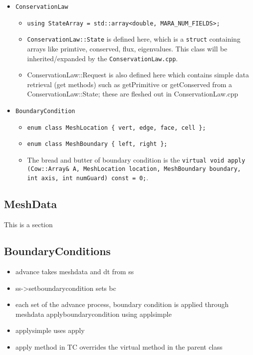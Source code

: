 \documentclass{article}
\begin{document}
\begin{itemize}
	\item \texttt{ConservationLaw}
	\begin{itemize}
		\item \texttt{using StateArray = std::array<double, MARA\_NUM\_FIELDS>;}
		\item \texttt{ConservationLaw::State} is defined here, which is a \texttt{struct} containing arrays like primtive, conserved, flux, eigenvalues. This class will be inherited/expanded by the \texttt{ConservationLaw.cpp}.
		\item ConservationLaw::Request is also defined here which contains simple data retrieval (get methods) such as getPrimitive or getConserved from a ConservationLaw::State; these are fleshed out in ConservationLaw.cpp
	\end{itemize}
	\item \texttt{BoundaryCondition}
	\begin{itemize}
		\item \texttt{enum class MeshLocation \{ vert, edge, face, cell \};}
		\item \texttt{enum class MeshBoundary \{ left, right \};}
	
		\item The bread and butter of boundary condition is the \texttt{virtual void apply (Cow::Array\& A, MeshLocation location, MeshBoundary boundary, int axis, int numGuard) const = 0;}.
	\end{itemize}
	
	
	
	
	
	

\end{itemize}


\subsection{MeshData}
This is a section 

\subsection{BoundaryConditions}
\begin{itemize}
	\item advance takes meshdata and dt from ss
	\item ss->setboundarycondition sets bc
	\item each set of the advance process, boundary condition is applied through meshdata applyboundarycondition using applsimple
	\item applysimple uses apply 
	\item apply method in TC overrides the virtual method in the parent class
\end{itemize}
\end{document}
